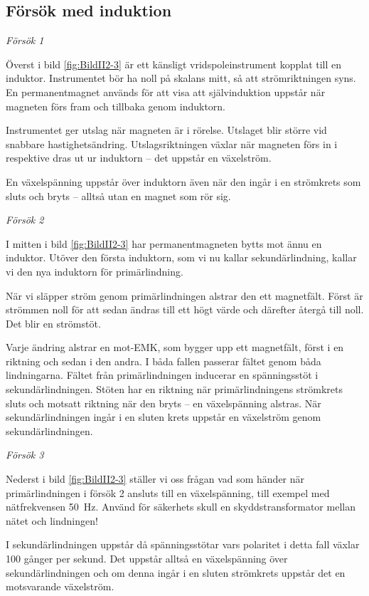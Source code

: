 \subsection{Försök med induktion}

\emph{Försök 1}


Överst i bild \ref{fig:BildII2-3} är ett känsligt vridspoleinstrument kopplat
till en induktor.
Instrumentet bör ha noll på skalans mitt, så att strömriktningen syns.
En permanentmagnet används för att visa att självinduktion uppstår när
magneten förs fram och tillbaka genom induktorn.

Instrumentet ger utslag när magneten är i rörelse. Utslaget blir större vid
snabbare hastighetsändring. Utslagsriktningen växlar när magneten förs in i
respektive dras ut ur induktorn -- det uppstår en växelström.

En växelspänning uppstår över induktorn även när den ingår i en strömkrets som
sluts och bryts -- alltså utan en magnet som rör sig.

\emph{Försök 2}

I mitten i bild \ref{fig:BildII2-3} har permanentmagneten bytts mot ännu en
induktor.
Utöver den första induktorn, som vi nu kallar sekundärlindning, kallar vi den
nya induktorn för primärlindning.

När vi släpper ström genom primärlindningen alstrar den ett magnetfält.
Först är strömmen noll för att sedan ändras till ett högt värde och därefter
återgå till noll. Det blir en strömstöt.

Varje ändring alstrar en mot-EMK, som bygger upp ett magnetfält, först i en
riktning och sedan i den andra. I båda fallen passerar fältet genom båda
lindningarna. Fältet från primärlindningen inducerar en spänningsstöt i
sekundärlindningen. Stöten har en riktning när primärlindningens strömkrets
sluts och motsatt riktning när den bryts -- en växelspänning alstras.
När sekundärlindningen ingår i en sluten krets uppstår en växelström genom
sekundärlindningen.

\emph{Försök 3}

Nederst i bild \ref{fig:BildII2-3} ställer vi oss frågan vad som händer när
primärlindningen i försök 2 ansluts till en växelspänning, till exempel 
med nätfrekvensen 50~Hz. Använd för säkerhets skull en skyddstransformator
mellan nätet och lindningen!

I sekundärlindningen uppstår då spänningsstötar vars polaritet i detta fall
växlar 100 gånger per sekund. Det uppstår alltså en växelspänning över
sekundärlindningen och om denna ingår i en sluten strömkrets uppstår det en
motsvarande växelström.

